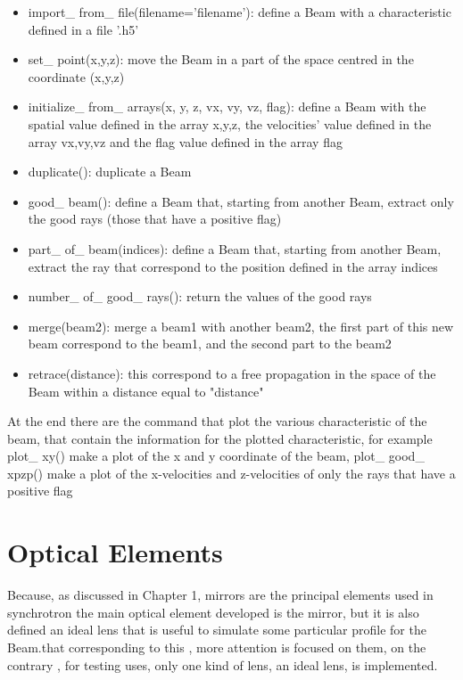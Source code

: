\begin{itemize}
\item import\_ from\_ file(filename='filename'): define a Beam with a characteristic defined in a file '.h5'
\item set\_ point(x,y,z): move the Beam in a part of the space centred in the coordinate (x,y,z)
\item initialize\_ from\_ arrays(x, y, z, vx, vy, vz, flag): define a Beam with the spatial value defined in the array x,y,z, the velocities' value defined in the array vx,vy,vz and the flag value defined in the array flag
\item duplicate(): duplicate a Beam
\item good\_ beam(): define a Beam that, starting from another Beam, extract only the good rays (those that have a positive flag)
\item part\_ of\_ beam(indices): define a Beam that, starting from another Beam, extract the ray that correspond to the position defined in the array indices
\item number\_ of\_ good\_ rays(): return the values of the good rays
\item merge(beam2): merge a beam1 with another beam2, the first part of this new beam correspond to the beam1, and the second part to the beam2
\item retrace(distance): this correspond to a free propagation in the space of the Beam within a distance equal to "distance" 
\end{itemize}
At the end there are the command that plot the various characteristic of the beam, that contain the information for the plotted characteristic, for example plot\_ xy() make a plot of the x and y coordinate of the beam, plot\_ good\_ xpzp() make a plot of the x-velocities and z-velocities of only the rays that have a positive flag


\section{Optical Elements}
Because, as discussed in Chapter 1, mirrors are the principal elements used in synchrotron the main optical element developed is the mirror, but it is also defined an ideal lens that is useful to simulate some particular profile for the Beam.that corresponding to this , more attention is focused on them, on the contrary , for testing uses, only one kind of lens, an ideal lens, is implemented. 
